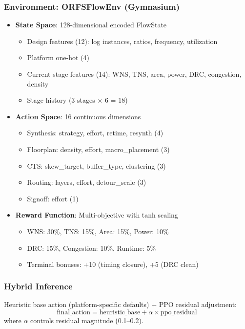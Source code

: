 \documentclass[10pt,conference]{IEEEtran}
\begin{document}
\subsubsection{Environment: ORFSFlowEnv (Gymnasium)}

\begin{itemize}
    \item \textbf{State Space}: 128-dimensional encoded FlowState
    \begin{itemize}
        \item Design features (12): log instances, ratios, frequency, utilization
        \item Platform one-hot (4)
        \item Current stage features (14): WNS, TNS, area, power, DRC, congestion, density
        \item Stage history (3 stages $\times$ 6 = 18)
    \end{itemize}
    \item \textbf{Action Space}: 16 continuous dimensions
    \begin{itemize}
        \item Synthesis: strategy, effort, retime, resynth (4)
        \item Floorplan: density, effort, macro\_placement (3)
        \item CTS: skew\_target, buffer\_type, clustering (3)
        \item Routing: layers, effort, detour\_scale (3)
        \item Signoff: effort (1)
    \end{itemize}
    \item \textbf{Reward Function}: Multi-objective with tanh scaling
    \begin{itemize}
        \item WNS: 30\%, TNS: 15\%, Area: 15\%, Power: 10\%
        \item DRC: 15\%, Congestion: 10\%, Runtime: 5\%
        \item Terminal bonuses: +10 (timing closure), +5 (DRC clean)
    \end{itemize}
\end{itemize}

\subsubsection{Hybrid Inference}
Heuristic base action (platform-specific defaults) + PPO residual adjustment:
\begin{equation}
\text{final\_action} = \text{heuristic\_base} + \alpha \times \text{ppo\_residual}
\end{equation}
where $\alpha$ controls residual magnitude (0.1--0.2).
\end{document}
